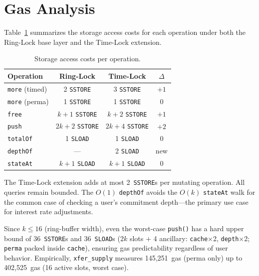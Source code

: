 \documentclass[10pt,a4paper,twocolumn]{article}
\begin{document}
\FloatBarrier

\section{Gas Analysis}
\label{sec:gas}

Table~\ref{tab:gas} summarizes the storage access costs for each operation under both the Ring-Lock base layer and the Time-Lock extension.

\begin{table}[htbp]
\centering
\caption{Storage access costs per operation.}
\label{tab:gas}
\small
\begin{tabular*}{0.95\columnwidth}{@{\extracolsep{\fill}}lccc@{}}
\toprule
Operation & Ring-Lock & Time-Lock & $\Delta$ \\
\midrule
\texttt{more} (timed) & 2 \texttt{SSTORE} & 3 \texttt{SSTORE} & $+1$ \\
\texttt{more} (perma) & 1 \texttt{SSTORE} & 1 \texttt{SSTORE} & $0$ \\
\texttt{free} & $k{+}1$ \texttt{SSTORE} & $k{+}2$ \texttt{SSTORE} & $+1$ \\
\texttt{push} & $2k{+}2$ \texttt{SSTORE} & $2k{+}4$ \texttt{SSTORE} & $+2$ \\
\texttt{totalOf} & 1 \texttt{SLOAD} & 1 \texttt{SLOAD} & $0$ \\
\texttt{depthOf} & --- & 2 \texttt{SLOAD} & new \\
\texttt{stateAt} & $k{+}1$ \texttt{SLOAD} & $k{+}1$ \texttt{SLOAD} & $0$ \\
\bottomrule
\end{tabular*}
\end{table}

The Time-Lock extension adds at most 2~\texttt{SSTORE}s per mutating operation. All queries remain bounded. The $O(1)$ \texttt{depthOf} avoids the $O(k)$ \texttt{stateAt} walk for the common case of checking a user's commitment depth---the primary use case for interest rate adjustments.

Since $k \leq 16$ (ring-buffer width), even the worst-case \texttt{push()} has a hard upper bound of 36~\texttt{SSTORE}s and 36~\texttt{SLOAD}s ($2k$ slots $+$ 4 ancillary: \texttt{cache}$\times$2, \texttt{depth}$\times$2; \texttt{perma} packed inside \texttt{cache}), ensuring gas predictability regardless of user behavior. Empirically, \texttt{xfer\_supply} measures 145{,}251~gas (perma only) up to 402{,}525~gas (16 active slots, worst case).
\end{document}
